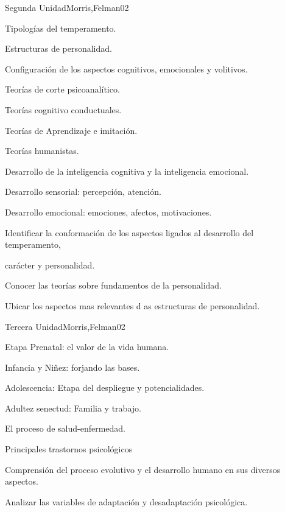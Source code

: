 \begin{syllabus}
\begin{unit}{Segunda Unidad}{Morris,Felman}{0}{2}
\begin{topics}
	\item Tipologías del temperamento.
	\item Estructuras de personalidad.
	\item Configuración de los aspectos cognitivos, emocionales y volitivos.
	\item Teorías de corte psicoanalítico.
	\item Teorías cognitivo conductuales.
	\item Teorías de Aprendizaje e imitación.
	\item Teorías humanistas.
	\item Desarrollo de la inteligencia cognitiva y la inteligencia emocional.
	\item Desarrollo sensorial: percepción, atención.
	\item Desarrollo emocional: emociones, afectos, motivaciones.
\end{topics}
\begin{learningoutcomes}
	\item Identificar la conformación de los aspectos ligados al desarrollo del temperamento,  
	\item       carácter y personalidad.
	\item Conocer las teorías sobre fundamentos de la personalidad.
	\item Ubicar los aspectos mas relevantes d as estructuras de personalidad.
\end{learningoutcomes}
\end{unit}

\begin{unit}{Tercera Unidad}{Morris,Felman}{0}{2}
\begin{topics}
	\item  Etapa Prenatal: el valor de la vida humana.
	\item Infancia y Niñez: forjando las bases.
	\item Adolescencia: Etapa del despliegue y potencialidades.
	\item Adultez senectud: Familia y trabajo.
	\item El proceso de salud-enfermedad.
	\item Principales trastornos psicológicos
\end{topics}
\begin{learningoutcomes}
	\item Comprensión del proceso evolutivo y el desarrollo humano en sus diversos aspectos.
	\item Analizar las variables de adaptación y desadaptación psicológica.
\end{learningoutcomes}
\end{unit}


\end{syllabus}
